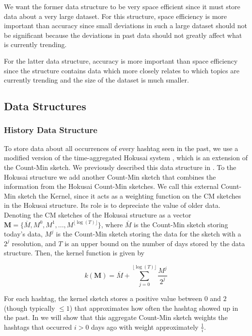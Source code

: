 \documentclass[twoside]{article}
\newcommand{\nref}[1]
 {\textbf{\nameref{#1}}}
\newcommand{\cc}[1]
 {\textbf{\cite{#1}}}
\begin{document}
We want the former data structure to be very space efficient since it must store data about a very large dataset.  For this structure, space efficiency is more important than accuracy since small deviations in such a large dataset should not be significant because the deviations in past data should not greatly affect what is currently trending.

For the latter data structure, accuracy is more important than space efficiency since the structure contains data which more closely relates to which topics are currently trending and the size of the dataset is much smaller.


\subsection{Data Structures}
\subsubsection{History Data Structure}

To store data about all occurrences of every hashtag seen in the past, we use a modified version of the time-aggregated Hokusai system \cc{Matusevych:2012}, which is an extension of the Count-Min sketch. We previously described this data structure in \nref{sec:PreviousWork}. 
To the Hokusai structure we add another Count-Min sketch that combines the information from the Hokusai Count-Min sketches. We call this external Count-Min sketch the Kernel, since it acts as a weighting function on the CM sketches in the Hokusai structure. Its role is to depreciate the value of older data.
Denoting the CM sketches of the Hokusai structure as a vector $\textbf{M} = \{\overline{M}, M^0, M^1, ..., M^{{\lfloor {\log(T)} \rfloor}}\}$, where $\bar{M}$ is the Count-Min sketch storing today's data, $M^j$ is the Count-Min sketch storing the data for the sketch with a $2^j$ resolution, and $T$ is an upper bound on the number of days stored by the data structure. Then, the kernel function is given by

\begin{equation} 
\label{eq:kernel}
\textit{k}(\textbf{M}) = \overline{M} + \sum\limits_{j=0}^{{\lfloor \log⁡(T) \rfloor}} \frac{M^j}{2^j}
\end{equation}

For each hashtag, the kernel sketch stores a positive value between $0$ and $2$ (though typically $\leq 1$) that approximates how often the hashtag showed up in the past. In \nref{sec:Correctness} we will show that this aggregate Count-Min sketch weights the hashtags that occurred $i > 0$ days ago with weight approximately $\frac{1}{i}$.
\end{document}
